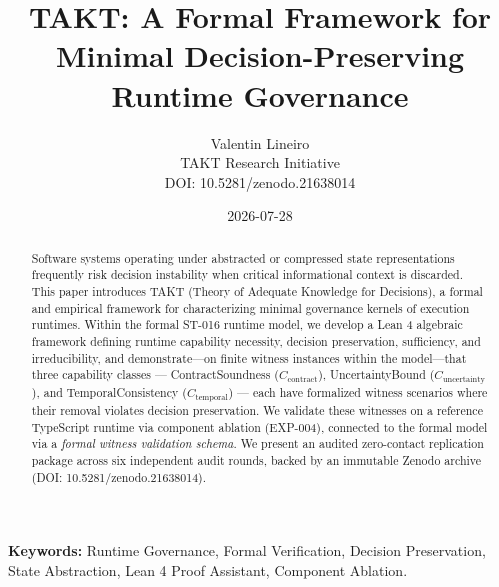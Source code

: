 \documentclass[11pt,a4paper]{article}
\begin{document}
\title{TAKT: A Formal Framework for Minimal Decision-Preserving Runtime Governance}

\author{Valentin Lineiro \\ \small TAKT Research Initiative \\ \small DOI: 10.5281/zenodo.21638014}

\date{2026-07-28}
\maketitle

\begin{abstract}\noindent
Software systems operating under abstracted or compressed state representations
frequently risk decision instability when critical informational context is discarded.
This paper introduces TAKT (Theory of Adequate Knowledge for Decisions), a formal
and empirical framework for characterizing minimal governance kernels of execution
runtimes. Within the formal ST-016 runtime model, we develop a Lean 4 algebraic
framework defining runtime capability necessity, decision preservation, sufficiency,
and irreducibility, and demonstrate---on finite witness instances within the
model---that three capability classes ---
ContractSoundness ($C_{\text{contract}}$), UncertaintyBound ($C_{\text{uncertainty}}$),
and TemporalConsistency ($C_{\text{temporal}}$) --- each have formalized witness
scenarios where their removal violates decision preservation.
We validate these witnesses on a reference TypeScript runtime via component ablation
(EXP-004), connected to the formal model via a \emph{formal witness validation schema}.
We present an audited zero-contact replication package across six independent audit
rounds, backed by an immutable Zenodo archive (DOI: 10.5281/zenodo.21638014).
\end{abstract}

\smallskip\noindent\textbf{Keywords:} Runtime Governance, Formal Verification, Decision Preservation, State Abstraction, Lean 4 Proof Assistant, Component Ablation.











\end{document}
